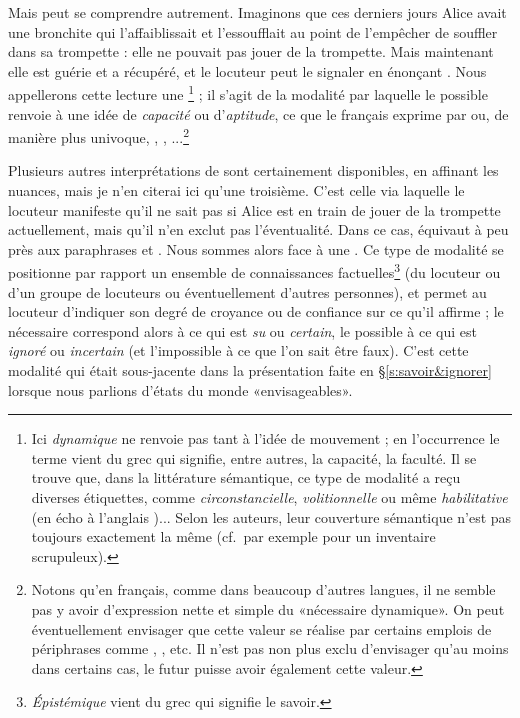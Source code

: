 Mais \Last[a] peut se comprendre autrement. Imaginons que ces derniers jours Alice avait une bronchite qui l'affaiblissait et l'essoufflait au point de l'empêcher de souffler dans sa trompette : elle ne pouvait pas jouer de la trompette. Mais maintenant elle est guérie et a récupéré, et le locuteur peut le signaler en énonçant \Last[a]. Nous appellerons cette lecture une \footnote{Ici \emph{dynamique} ne renvoie pas tant à l'idée de mouvement ; en l'occurrence le terme vient du grec  qui signifie, entre autres, la capacité, la faculté. Il se trouve que, dans la littérature sémantique, ce type de modalité a reçu diverses étiquettes, comme  \emph{circonstancielle}, \emph{volitionnelle} ou même \emph{habilitative} (en écho à l'anglais )... Selon les auteurs, leur couverture sémantique n'est pas toujours exactement la même (cf.\ par exemple \citet{Portner:09} pour un inventaire scrupuleux).} ; il s'agit de la modalité par laquelle le possible renvoie à une idée de \emph{capacité} ou d'\emph{aptitude}, ce que le français exprime par  ou, de manière plus univoque, , , ...\footnote{Notons qu'en français, comme dans beaucoup d'autres langues, il ne semble pas y avoir d'expression nette et simple du «nécessaire dynamique». On peut éventuellement envisager que cette valeur se réalise par certains emplois de périphrases comme , , etc. Il n'est pas non plus exclu d'envisager qu'au moins dans certains cas, le futur puisse avoir également cette valeur.} 

Plusieurs autres interprétations de \Last[a] sont certainement disponibles, en affinant les nuances, mais je n'en citerai ici qu'une troisième. 
C'est celle via laquelle le locuteur manifeste qu'il ne sait pas si Alice est en train de jouer de la trompette actuellement, mais qu'il n'en exclut pas l'éventualité.  Dans ce cas, \Last[a] équivaut à peu près aux paraphrases  et .  Nous sommes alors face à une . Ce type de modalité se positionne par rapport un ensemble de connaissances factuelles\footnote{\emph{Épistémique} vient du grec  qui signifie le savoir.} 
(du locuteur ou d'un groupe de locuteurs ou éventuellement d'autres personnes), et permet au locuteur d'indiquer son degré de croyance ou de confiance sur ce qu'il affirme ;
le nécessaire correspond alors à ce qui est \emph{su} ou \emph{certain}, le possible à ce qui est \emph{ignoré} ou \emph{incertain} (et l'impossible à ce que l'on sait être faux).
C'est cette modalité qui était sous-jacente dans la présentation faite en \S\ref{s:savoir&ignorer} lorsque nous parlions d'états du monde «envisageables».

